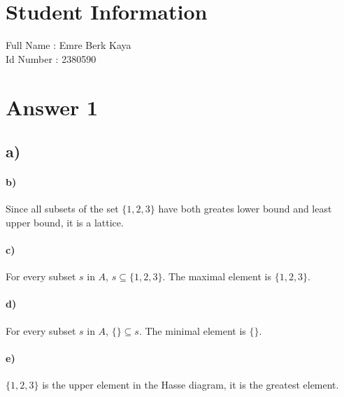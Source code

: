\documentclass[12pt]{article}
\begin{document}
\section*{Student Information } 
Full Name : Emre Berk Kaya \\
Id Number : 2380590 \\

\section*{Answer 1}
\subsection*{a)}
\paragraph*{b)}
Since all subsets of the set $\{1,2,3\}$ have both greates lower bound and least upper bound, it is a lattice.

\paragraph*{c)}
For every subset $s$ in $A$, $s \subseteq \{1,2,3\}$. The maximal element is $\{1,2,3\}$.

\paragraph*{d)}
For every subset $s$ in $A$, $\{\} \subseteq s$. The minimal element is $\{\}$.

\paragraph*{e)}
$\{1,2,3\}$ is the upper element in the Hasse diagram, it is the greatest element.
\end{document}
